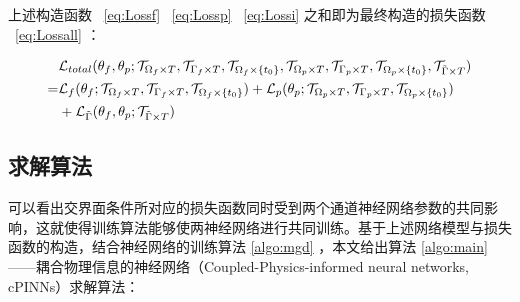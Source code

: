 上述构造函数 ~\eqref{eq:Lossf} ~\eqref{eq:Lossp} ~\eqref{eq:Lossi} 之和即为最终构造的损失函数 ~\eqref{eq:Lossall} ：

\begin{equation}\label{eq:Lossall}
    \begin{aligned}
        &\Lossall \\
        =& \Lossf + \Lossp \\
        &+ \Lossi
    \end{aligned}
\end{equation}

\subsection{求解算法}

可以看出交界面条件所对应的损失函数同时受到两个通道神经网络参数的共同影响，这就使得训练算法能够使两神经网络进行共同训练。基于上述网络模型与损失函数的构造，结合神经网络的训练算法 \ref{algo:mgd} ，本文给出算法 \ref{algo:main} ——耦合物理信息的神经网络（Coupled-Physics-informed neural networks, cPINNs）求解算法：

